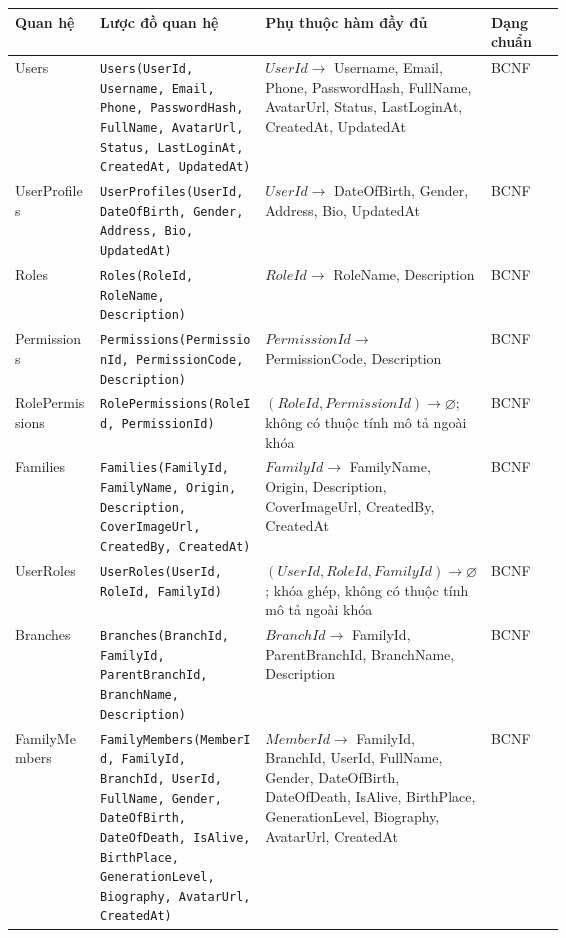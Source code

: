 \begin{center}
\scriptsize
\begin{tabularx}{\linewidth}{@{}l>{\raggedright\arraybackslash}p{0.30\linewidth}>{\raggedright\arraybackslash}p{0.34\linewidth}l@{}}
\toprule
\textbf{Quan hệ} & \textbf{Lược đồ quan hệ} & \textbf{Phụ thuộc hàm đầy đủ} & \textbf{Dạng chuẩn} \\
\midrule

Users &
\texttt{Users(UserId, Username, Email, Phone, PasswordHash, FullName, AvatarUrl, Status, LastLoginAt, CreatedAt, UpdatedAt)} &
$UserId \rightarrow$ Username, Email, Phone, PasswordHash, FullName, AvatarUrl, Status, LastLoginAt, CreatedAt, UpdatedAt &
BCNF \\

UserProfiles &
\texttt{UserProfiles(UserId, DateOfBirth, Gender, Address, Bio, UpdatedAt)} &
$UserId \rightarrow$ DateOfBirth, Gender, Address, Bio, UpdatedAt &
BCNF \\

Roles &
\texttt{Roles(RoleId, RoleName, Description)} &
$RoleId \rightarrow$ RoleName, Description &
BCNF \\

Permissions &
\texttt{Permissions(PermissionId, PermissionCode, Description)} &
$PermissionId \rightarrow$ PermissionCode, Description &
BCNF \\

RolePermissions &
\texttt{RolePermissions(RoleId, PermissionId)} &
$(RoleId,PermissionId)\rightarrow \varnothing$; không có thuộc tính mô tả ngoài khóa &
BCNF \\

Families &
\texttt{Families(FamilyId, FamilyName, Origin, Description, CoverImageUrl, CreatedBy, CreatedAt)} &
$FamilyId \rightarrow$ FamilyName, Origin, Description, CoverImageUrl, CreatedBy, CreatedAt &
BCNF \\

UserRoles &
\texttt{UserRoles(UserId, RoleId, FamilyId)} &
$(UserId,RoleId,FamilyId)\rightarrow\varnothing$; khóa ghép, không có thuộc tính mô tả ngoài khóa &
BCNF \\

Branches &
\texttt{Branches(BranchId, FamilyId, ParentBranchId, BranchName, Description)} &
$BranchId \rightarrow$ FamilyId, ParentBranchId, BranchName, Description &
BCNF \\

FamilyMembers &
\texttt{FamilyMembers(MemberId, FamilyId, BranchId, UserId, FullName, Gender, DateOfBirth, DateOfDeath, IsAlive, BirthPlace, GenerationLevel, Biography, AvatarUrl, CreatedAt)} &
$MemberId \rightarrow$ FamilyId, BranchId, UserId, FullName, Gender, DateOfBirth, DateOfDeath, IsAlive, BirthPlace, GenerationLevel, Biography, AvatarUrl, CreatedAt &
BCNF \\


\end{tabularx}
\end{center}
